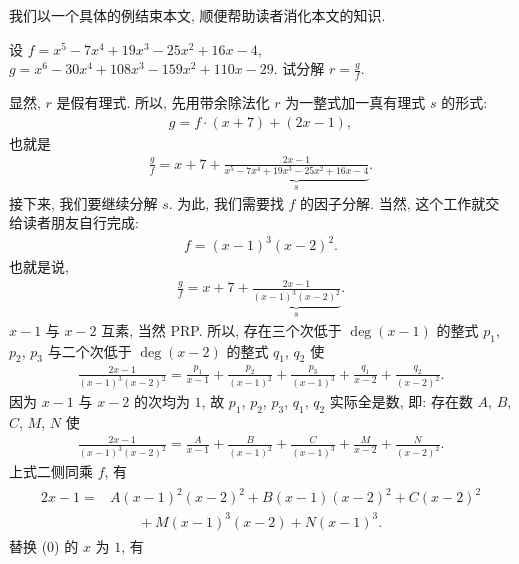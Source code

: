 我们以一个具体的例结束本文, 顺便帮助读者消化本文的知识.

\begin{example}
    设 $f = x^5 - 7x^4 + 19x^3 - 25x^2 + 16x - 4$, $g = x^6 - 30x^4 + 108x^3 - 159x^2 + 110x - 29$. 试分解 $r = \frac{g}{f}$.

    显然, $r$ 是假有理式. 所以, 先用带余除法化 $r$ 为一整式加一真有理式 $s$ 的形式:
    \begin{align*}
        g = f \cdot (x + 7) + (2x - 1),
    \end{align*}
    也就是
    \begin{align*}
        \frac{g}{f} = x + 7 + {\underbrace{\frac{2x - 1}{x^5 - 7x^4 + 19x^3 - 25x^2 + 16x - 4}}_{s}}.
    \end{align*}
    接下来, 我们要继续分解 $s$. 为此, 我们需要找 $f$ 的因子分解. 当然, 这个工作就交给读者朋友自行完成:
    \begin{align*}
        f = (x - 1)^3 (x - 2)^2.
    \end{align*}
    也就是说,
    \begin{align*}
        \frac{g}{f} = x + 7 + {\underbrace{\frac{2x - 1}{(x - 1)^3 (x - 2)^2}}_{s}}.
    \end{align*}
    $x - 1$ 与 $x - 2$ 互素, 当然 PRP. 所以, 存在三个次低于 $\deg {(x - 1)}$ 的整式 $p_1$, $p_2$, $p_3$ 与二个次低于 $\deg {(x - 2)}$ 的整式 $q_1$, $q_2$ 使
    \begin{align*}
        \frac{2x - 1}{(x - 1)^3 (x - 2)^2} = \frac{p_1}{x - 1} + \frac{p_2}{(x - 1)^2} + \frac{p_3}{(x - 1)^3} + \frac{q_1}{x - 2} + \frac{q_2}{(x - 2)^2}.
    \end{align*}
    因为 $x - 1$ 与 $x - 2$ 的次均为 $1$, 故 $p_1$, $p_2$, $p_3$, $q_1$, $q_2$ 实际全是数, 即: 存在数 $A$, $B$, $C$, $M$, $N$ 使
    \begin{align*}
        \frac{2x - 1}{(x - 1)^3 (x - 2)^2} = \frac{A}{x - 1} + \frac{B}{(x - 1)^2} + \frac{C}{(x - 1)^3} + \frac{M}{x - 2} + \frac{N}{(x - 2)^2}.
    \end{align*}
    上式二侧同乘 $f$, 有
    \begin{align*}
        \tag*{(0)} \begin{aligned}
            2x - 1
            = {} & A (x - 1)^2 (x - 2)^2 + B (x - 1) (x - 2)^2 + C (x - 2)^2 \\
                 & \qquad + M (x - 1)^3 (x - 2) + N (x - 1)^3.
        \end{aligned}
    \end{align*}
    替换 (0) 的 $x$ 为 $1$, 有
    \begin{align*}

\end{align*}
\end{example}
